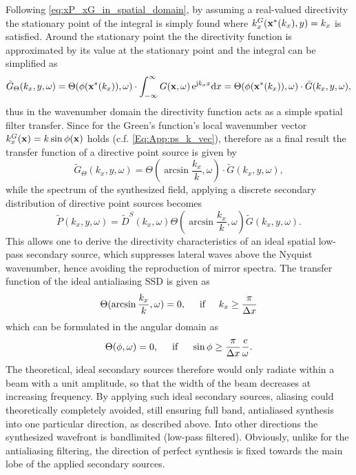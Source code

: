 Following \eqref{eq:xP_xG_in_spatial_domain}, by assuming a real-valued directivity the stationary point of the integral is simply found where $k_x^{G}(\mathbf{x}^*(k_x),y) = k_x$ is satisfied.
Around the stationary point the the directivity function is approximated by its value at the stationary point and the integral can be simplified as
\begin{equation}
\tilde{G}_{\Theta}(k_x,y,\omega) = \Theta(\phi(\mathbf{x}^*(k_x)),\omega) \cdot \int_{-\infty}^{\infty} 
G(\mathbf{x},\omega) \, \mathrm{e}^{\mathrm{j} k_x x} \mathrm{d} x =
\Theta(\phi(\mathbf{x}^*(k_x)),\omega) \cdot 
\tilde{G}(k_x,y,\omega),
\end{equation}
thus in the wavenumber domain the directivity function acts as a simple spatial filter transfer.
Since for the Green's function's local wavenumber vector $k_x^{G}(\mathbf{x}) = k \sin \phi(\mathbf{x})$ holds (c.f. \eqref{Eq:App:ps_k_vec}), therefore as a final result the transfer function of a directive point source is given by
\begin{equation}
\tilde{G}_{\Theta}(k_x,y,\omega) = 
\Theta(\arcsin \frac{k_x}{k},\omega) \cdot 
\tilde{G}(k_x,y,\omega),
\end{equation}
while the spectrum of the synthesized field, applying a discrete secondary distribution of directive point sources becomes
\begin{equation}
\tilde{P}(k_x,y,\omega) = \tilde{D}^S(k_x,\omega) \Theta(\arcsin \frac{k_x}{k},\omega) \tilde{G}(k_x,y,\omega).
\end{equation}
This allows one to derive the directivity characteristics of an ideal spatial low-pass secondary source, which suppresses lateral waves above the Nyquist wavenumber, hence avoiding the reproduction of mirror spectra.
The transfer function of the ideal antialiasing SSD is given as
\begin{equation}
\Theta(\arcsin \frac{k_x}{k},\omega) = 0, \hspace{5mm} \text{if} \hspace{5mm} k_x \geq \frac{\pi}{\Delta x}
\end{equation}
which can be formulated in the angular domain as
\begin{equation}
\Theta(\phi,\omega) = 0, \hspace{5mm} \text{if} \hspace{5mm} \sin \phi \geq \frac{\pi}{\Delta x} \frac{c}{\omega}.
\end{equation}
The theoretical, ideal secondary sources therefore would only radiate within a beam with a unit amplitude, so that the width of the beam decreases at increasing frequency.
By applying such ideal secondary sources, aliasing could theoretically completely avoided, still ensuring full band, antialiased synthesis into one particular direction, as described above.
Into other directions the synthesized wavefront is bandlimited (low-pass filtered).
Obviously, unlike for the antialiasing filtering, the direction of perfect synthesis is fixed towards the main lobe of the applied secondary sources.

